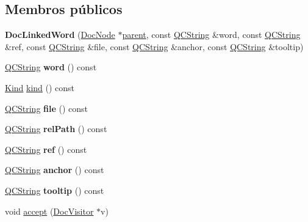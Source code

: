 \subsection*{Membros públicos}
\begin{DoxyCompactItemize}
\item 
\hypertarget{class_doc_linked_word_a1a7650cea89b2e814e8a4f64fa3c4269}{{\bfseries Doc\-Linked\-Word} (\hyperlink{class_doc_node}{Doc\-Node} $\ast$\hyperlink{class_doc_node_abd7f070d6b0a38b4da71c2806578d19d}{parent}, const \hyperlink{class_q_c_string}{Q\-C\-String} \&word, const \hyperlink{class_q_c_string}{Q\-C\-String} \&ref, const \hyperlink{class_q_c_string}{Q\-C\-String} \&file, const \hyperlink{class_q_c_string}{Q\-C\-String} \&anchor, const \hyperlink{class_q_c_string}{Q\-C\-String} \&tooltip)}\label{class_doc_linked_word_a1a7650cea89b2e814e8a4f64fa3c4269}

\item 
\hypertarget{class_doc_linked_word_a2c052f8584abb7e8711181e45c0ef55e}{\hyperlink{class_q_c_string}{Q\-C\-String} {\bfseries word} () const }\label{class_doc_linked_word_a2c052f8584abb7e8711181e45c0ef55e}

\item 
\hyperlink{class_doc_node_aa10c9e8951b8ccf714a59ec321bdac5b}{Kind} \hyperlink{class_doc_linked_word_aa9d037bed9f9a083d0cd01485637d843}{kind} () const 
\item 
\hypertarget{class_doc_linked_word_aeaa8cdb0fbabc1058b7d3813f2fd223b}{\hyperlink{class_q_c_string}{Q\-C\-String} {\bfseries file} () const }\label{class_doc_linked_word_aeaa8cdb0fbabc1058b7d3813f2fd223b}

\item 
\hypertarget{class_doc_linked_word_a3aa6799d4713d51d9cc4862af165671c}{\hyperlink{class_q_c_string}{Q\-C\-String} {\bfseries rel\-Path} () const }\label{class_doc_linked_word_a3aa6799d4713d51d9cc4862af165671c}

\item 
\hypertarget{class_doc_linked_word_aba9c65e4f9c616d6552a1b5d5e9519a6}{\hyperlink{class_q_c_string}{Q\-C\-String} {\bfseries ref} () const }\label{class_doc_linked_word_aba9c65e4f9c616d6552a1b5d5e9519a6}

\item 
\hypertarget{class_doc_linked_word_acd17ae1d9600f864b1beb85dfb99a4f4}{\hyperlink{class_q_c_string}{Q\-C\-String} {\bfseries anchor} () const }\label{class_doc_linked_word_acd17ae1d9600f864b1beb85dfb99a4f4}

\item 
\hypertarget{class_doc_linked_word_a186eaac9fc06de396dbea8aa794da8aa}{\hyperlink{class_q_c_string}{Q\-C\-String} {\bfseries tooltip} () const }\label{class_doc_linked_word_a186eaac9fc06de396dbea8aa794da8aa}

\item 
void \hyperlink{class_doc_linked_word_a7ba716e854ae2f8f87a4eb2140e302b6}{accept} (\hyperlink{class_doc_visitor}{Doc\-Visitor} $\ast$v)
\end{DoxyCompactItemize}
